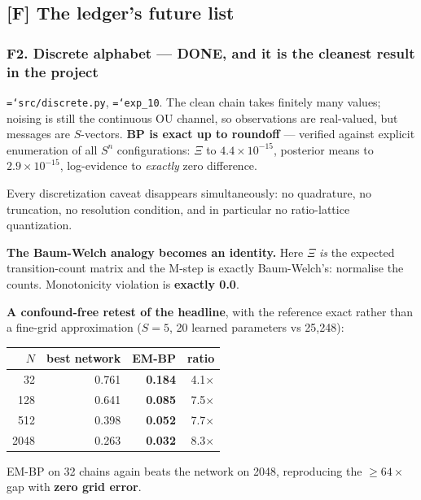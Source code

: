 \documentclass[11pt,a4paper]{article}
\newcommand{\done}{\textcolor{GoodGreen}{\textbf{DONE}}}
\newcommand{\code}[1]{\texttt{\small\hyphenchar\font=`\-\relax #1}}
\begin{document}
\subsection{[F] The ledger's future list}

\subsubsection*{F2. Discrete alphabet --- \done, and it is the cleanest result in the project}

\code{src/discrete.py}, \code{exp\_10}. The clean chain takes finitely many values; noising
is still the continuous OU channel, so observations are real-valued, but messages are
$S$-vectors. \textbf{BP is exact up to roundoff} --- verified against explicit enumeration
of all $S^n$ configurations: $\Xi$ to $4.4\times10^{-15}$, posterior means to
$2.9\times10^{-15}$, log-evidence to \emph{exactly} zero difference.

Every discretization caveat disappears simultaneously: no quadrature, no truncation, no
resolution condition, and in particular no ratio-lattice quantization.

\textbf{The Baum-Welch analogy becomes an identity.} Here $\Xi$ \emph{is} the expected
transition-count matrix and the M-step is exactly Baum-Welch's: normalise the counts.
Monotonicity violation is \textbf{exactly 0.0}.

\textbf{A confound-free retest of the headline}, with the reference exact rather than a
fine-grid approximation ($S=5$, 20 learned parameters vs 25{,}248):

\begin{center}
\begin{tabular}{@{}rrrr@{}}
\toprule
$N$ & best network & \textbf{EM-BP} & ratio \\
\midrule
32   & 0.761 & \textbf{0.184} & 4.1$\times$ \\
128  & 0.641 & \textbf{0.085} & 7.5$\times$ \\
512  & 0.398 & \textbf{0.052} & 7.7$\times$ \\
2048 & 0.263 & \textbf{0.032} & 8.3$\times$ \\
\bottomrule
\end{tabular}
\end{center}

\noindent
EM-BP on 32 chains again beats the network on 2048, reproducing the $\ge 64\times$ gap with
\textbf{zero grid error}.
\end{document}
